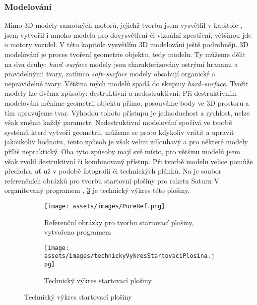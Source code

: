 \subsubsection{Modelování}
{Mimo 3D modely samotných motorů, jejichž tvorbu jsem vysvětlil v kapitole , jsem vytvořil i mnoho modelů pro dovysvětlení či vizuální zpestření, většinou jde o motory vozidel. V této kapitole vysvětlím 3D modelování ještě podrobněji.}\odst
{3D modelování je proces tvoření geometrie objektu, tedy modelu. Ty můžeme dělit na dva druhy: \textit{hard--surface} modely jsou charakterizovány ostrými hranami a pravidelnými tvary, zatímco \textit{soft--surface} modely obsahují organické a nepravidelné tvary. Většina mých modelů spadá do skupiny \textit{hard--surface}.}\odst
{Tvořit modely lze dvěma způsoby: destruktivní a nedestruktivní. Při destruktivním modelování měníme geometrii objektu přímo, posouváme body ve 3D prostoru a tím upravujeme tvar. Výhodou tohoto přístupu je jednoduchost a rychlost, nelze však změnit každý parametr. Nedestruktivní modelování spočívá ve tvorbě systémů které vytvoří geometrii, můžeme se proto kdykoliv vrátit a upravit jakoukoliv hodnotu, tento způsob je však velmi zdlouhavý a pro některé modely příliš nepraktický. Oba tyto způsoby mají své místo, pro většinu modelů jsem však zvolil destruktivní či kombinovaný přístup.}\odst
{Při tvorbě modelu velice pomůže předloha, ať už v podobě fotografií či technických plánků. Na  je soubor referenčních obrázků pro tvorbu startovní plošiny pro raketu Saturn V organitovaný programem , \ref{obr:predlohaVykres} je technický výkres této plošiny.}

\begin{figure}[H]
    \centering
    \begingroup
    \makeatletter
    \renewcommand\thesubfigure{\thefigure~--~\@nameuse{subfiglabel@\alph{subfigure}}}
    \newcommand{\subfiglabel@a}{vlevo}
    \newcommand{\subfiglabel@b}{vpravo}
    \captionsetup[subfigure]{labelformat=simple, labelsep=colon}
    \renewcommand\p@subfigure{}
    \makeatother
    \begin{subfigure}{.7\textwidth}
        \centering
        \texttt{[image: assets/images/PureRef.png]}
        \caption{Referenční obrázky pro tvorbu startovací plošiny, \\vytvořeno programem }
        \label{obr:predlohaFotky}
    \end{subfigure}%
    \begin{subfigure}{.3\textwidth}
        \centering
        \texttt{[image: assets/images/technickyVykresStartovaciPlosina.jpg]}
        \caption{Technický výkres startovací plošiny}
        \label{obr:predlohaVykres}
    \end{subfigure}
    \endgroup
\end{figure}

